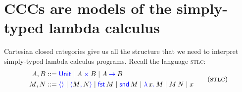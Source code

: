 




\section{CCCs are models of the simply-typed lambda calculus}
Cartesian closed categories give us all the structure that we need to interpret
simply-typed lambda calculus programs. Recall the language \textsc{stlc}:
\begin{gather}
  \begin{aligned}
   A,B &::= \plkw{Unit}
     \mid A \pltimes B
     \mid A \plto B
  \\
  M,N &::= \plunit{}
      \mid \plpair{M}{N}
      \mid \plfst{M}
      \mid \plsnd{M}
      \mid \pllam{x}{M}
      \mid \plapp{M}{N}
      \mid x
  \end{aligned}
  \tag{\textsc{stlc}}
\end{gather}

